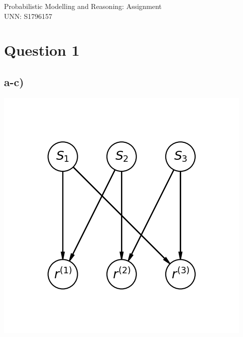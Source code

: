 \documentclass[11pt,a4paper]{article}
\begin{document}
\begin{center}
{\Large Probabilistic Modelling and Reasoning: Assignment}\\
{\large UNN: S1796157}
\end{center}

\section*{Question 1}

\subsection*{a-c)}

\begin{multicols}{3}
\includegraphics[scale=0.6]{./images/q1a.png}

\end{multicols}
\end{document}
